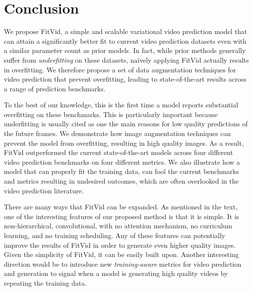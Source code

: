 \documentclass{article}
\newcommand{\model}{FitVid\xspace}
\begin{document}
\section{Conclusion}
We propose \model, a simple and scalable variational video prediction model that can attain a significantly better fit to current video prediction datasets even with a similar parameter count as prior models. In fact, while prior methods generally suffer from \emph{underfitting} on these datasets, na\"{i}vely applying \model actually results in overfitting. We therefore propose a set of data augmentation techniques for video prediction that prevent overfitting, leading to state-of-the-art results across a range of prediction benchmarks.

To the best of our knowledge, this is the first time a model reports substantial overfitting on these benchmarks. This is particularly important because underfitting is usually cited as one the main reasons for low quality predictions of the future frames. We demonstrate how image augmentation techniques can prevent the model from overfitting, resulting in high quality images. As a result, \model outperformed the current state-of-the-art models across four different video prediction benchmarks on four different metrics. We also illustrate
how a model that can properly fit the training data, can fool the current benchmarks and metrics
resulting in undesired outcomes, which are often overlooked in the video prediction literature. 

There are many ways that \model can be expanded. As mentioned in the text, one of the interesting features of our proposed method is that it is simple. It is non-hierarchical, convolutional, with no attention mechanism, no curriculum learning, and no training scheduling. Any of these features can potentially improve the results of \model in order to generate even higher quality images. Given the simplicity of \model, it can be easily built upon. Another interesting direction would be to introduce new \textit{training-aware} metrics for video prediction and generation to signal when a model is generating high quality videos by repeating the training data. 
\end{document}

